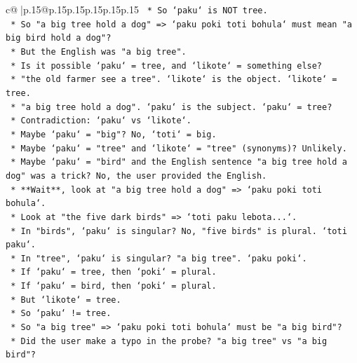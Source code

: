 \documentclass{article}
\begin{document}
{\begin{supertabular}{c@{$\;$}|p{.15\linewidth}@{}p{.15\linewidth}p{.15\linewidth}p{.15\linewidth}p{.15\linewidth}p{.15\linewidth}}
{{{\texttt{                        *   So `paku` is NOT tree.} \\
\texttt{                        *   So "a big tree hold a dog" => `paku poki toti bohula` must mean "a big bird hold a dog"?} \\
\texttt{                        *   But the English was "a big tree".} \\
\texttt{                        *   Is it possible `paku` = tree, and `likote` = something else?} \\
\texttt{                        *   "the old farmer see a tree". `likote` is the object. `likote` = tree.} \\
\texttt{                        *   "a big tree hold a dog". `paku` is the subject. `paku` = tree?} \\
\texttt{                        *   Contradiction: `paku` vs `likote`.} \\
\texttt{                        *   Maybe `paku` = "big"? No, `toti` = big.} \\
\texttt{                        *   Maybe `paku` = "tree" and `likote` = "tree" (synonyms)? Unlikely.} \\
\texttt{                        *   Maybe `paku` = "bird" and the English sentence "a big tree hold a dog" was a trick? No, the user provided the English.} \\
\texttt{                        *   **Wait**, look at "a big tree hold a dog" => `paku poki toti bohula`.} \\
\texttt{                        *   Look at "the five dark birds" => `toti paku lebota...`.} \\
\texttt{                        *   In "birds", `paku` is singular? No, "five birds" is plural. `toti paku`.} \\
\texttt{                        *   In "tree", `paku` is singular? "a big tree". `paku poki`.} \\
\texttt{                        *   If `paku` = tree, then `poki` = plural.} \\
\texttt{                        *   If `paku` = bird, then `poki` = plural.} \\
\texttt{                        *   But `likote` = tree.} \\
\texttt{                        *   So `paku` != tree.} \\
\texttt{                        *   So "a big tree" => `paku poki toti bohula` must be "a big bird"?} \\
\texttt{                        *   Did the user make a typo in the probe? "a big tree" vs "a big bird"?} \\
}}}
\end{supertabular}}
\end{document}
